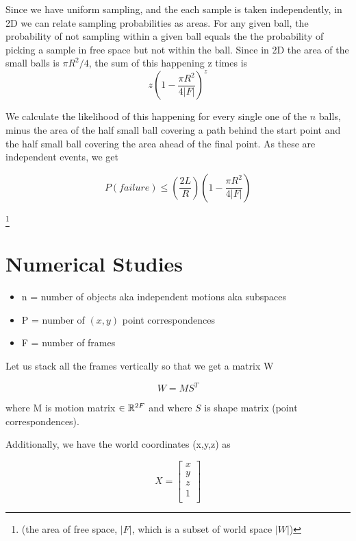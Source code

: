 \documentclass[a4paper]{article}
\begin{document}
Since we have uniform sampling, and the each sample is taken independently, in
2D we can relate sampling probabilities as areas.  For any given ball, the
probability of not sampling within a given ball equals the the probability of
picking a sample in free space but not within the ball. Since in 2D the area of the small balls is $\pi R^2 / 4$, the sum of this happening z times is 
\begin{equation}
    z \left(1 - \frac{\pi R^2}{4|F|}\right) ^z
\end {equation}

We calculate the likelihood of this happening for every single one of the $n$
    balls, minus the area of the half small ball covering a path behind the start
    point and the half small ball covering the area ahead of the final point. As these are
    independent events, we get

\begin{equation}
    P(failure) \leq \left(\frac{2L}{R}\right) \left(1 - \frac{\pi R^2}{4|F|}\right)
\end {equation}

\footnote{(the area of free space, $|F|$, which is a subset of world space
$|W|$)}

\section{Numerical Studies}

\newcommand{\matx}[1]{\mbox{\tt #1}} \newcommand{\vect}[1]{{\bf #1}}

\begin{itemize} \item n = number of objects aka independent motions aka subspaces \item P = number of $(x, y)$ point correspondences \item F = number
of frames \end{itemize}

Let us stack all the frames vertically so that we get a matrix W

$$W = MS^T$$

where M is motion matrix $\in \mathbb{R}^{2F \time 4}$ and where $S$ is shape matrix (point correspondences).

Additionally, we have the world coordinates (x,y,z) as

\begin{equation} X = \begin{bmatrix} x \\ y \\ z \\ 1 \\ \end{bmatrix} \end{equation}
\end{document}
